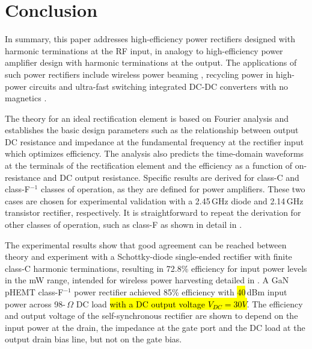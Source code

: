 


\section{Conclusion}
In summary, this paper addresses high-efficiency power rectifiers designed with harmonic terminations at the RF input, in analogy to high-efficiency power amplifier design with harmonic terminations at the output. The applications of such power rectifiers include wireless power beaming \cite{brown_rect2}, recycling power in high-power circuits \cite{asbeck} and ultra-fast switching integrated DC-DC converters with no magnetics \cite{4500dcdc}.

The theory for an ideal rectification element is based on Fourier analysis and establishes the basic design parameters such as the relationship between output DC resistance and impedance at the fundamental frequency at the rectifier input which optimizes efficiency. The analysis also predicts the time-domain waveforms at the terminals of the rectification element and the efficiency as a function of on-resistance and DC output resistance. Specific results are derived for class-C and class-F$^{-1}$ classes of operation, as they are defined for power amplifiers. These two cases are chosen for experimental validation with a 2.45\,GHz diode and 2.14\,GHz transistor rectifier, respectively. It is straightforward to repeat the derivation for other classes of operation, such as class-F as shown in detail in \cite{roberg_phd}.

The experimental results show that good agreement can be reached between theory and experiment with a Schottky-diode single-ended rectifier with finite class-C harmonic terminations, resulting in 72.8\% efficiency for input power levels in the mW range, intended for wireless power harvesting detailed in \cite{robergIMS2012,erezMTT2012}. A GaN pHEMT class-F$^{-1}$ power rectifier achieved 85\% efficiency with \hl{40}\,dBm input power across 98-\,$\Omega$ DC load \hl{with a DC output voltage $V_{DC}=30V$}. The efficiency and output voltage of the self-synchronous rectifier are shown to depend on the input power at the drain, the impedance at the gate port and the DC load at the output drain bias line, but not on the gate bias.

